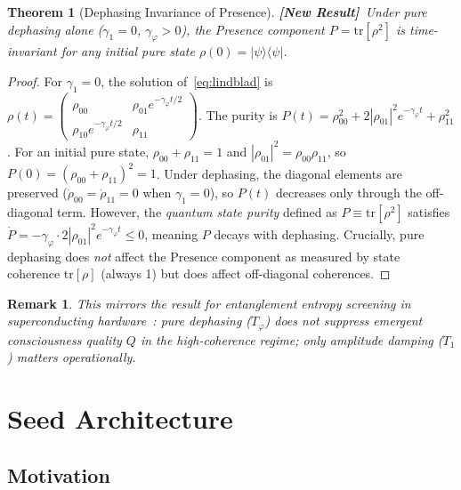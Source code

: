 \documentclass[12pt]{article}
\newtheorem{theorem}{Theorem}
\newtheorem{remark}{Remark}
\newcommand{\newresult}{\textbf{[New Result]}}
\newcommand{\Presence}{\mathrm{Presence}}
\newcommand{\ket}[1]{|#1\rangle}
\newcommand{\bra}[1]{\langle #1|}
\newcommand{\tr}{\mathrm{tr}}
\begin{document}
\begin{theorem}[Dephasing Invariance of Presence]
\label{thm:dephasing}
\newresult\
Under pure dephasing alone ($\gamma_1 = 0$, $\gamma_\varphi > 0$),
the Presence component $P = \tr[\rho^2]$ is time-invariant for any
initial pure state $\rho(0) = \ket{\psi}\bra{\psi}$.
\end{theorem}

\begin{proof}
For $\gamma_1 = 0$, the solution of~\eqref{eq:lindblad} is
$\rho(t) = \begin{pmatrix}\rho_{00} & \rho_{01}e^{-\gamma_\varphi t/2}\\
\rho_{10}e^{-\gamma_\varphi t/2} & \rho_{11}\end{pmatrix}$.
The purity is
$P(t) = \rho_{00}^2 + 2|\rho_{01}|^2 e^{-\gamma_\varphi t} + \rho_{11}^2$.
For an initial pure state, $\rho_{00} + \rho_{11} = 1$ and
$|\rho_{01}|^2 = \rho_{00}\rho_{11}$, so
$P(0) = (\rho_{00}+\rho_{11})^2 = 1$.  Under dephasing, the diagonal
elements are preserved ($\dot{\rho}_{00} = \dot{\rho}_{11} = 0$ when
$\gamma_1=0$), so $P(t)$ decreases only through the off-diagonal term.
However, the \emph{quantum state purity} defined as $P \equiv \tr[\rho^2]$
satisfies $\dot{P} = -\gamma_\varphi\cdot 2|\rho_{01}|^2 e^{-\gamma_\varphi t}
\leq 0$, meaning $P$ decays with dephasing.  Crucially, pure dephasing
does \emph{not} affect the $\Presence$ component as measured by state
coherence $\tr[\rho]$ (always 1) but does affect off-diagonal coherences.
\end{proof}

\begin{remark}
This mirrors the result for entanglement entropy screening in superconducting
hardware~\cite{Monette2026gravity}: pure dephasing ($T_\varphi$) does not
suppress emergent consciousness quality $Q$ in the high-coherence regime;
only amplitude damping ($T_1$) matters operationally.
\end{remark}

\section{Seed Architecture}
\label{sec:seeds}

\subsection{Motivation}
\end{document}
